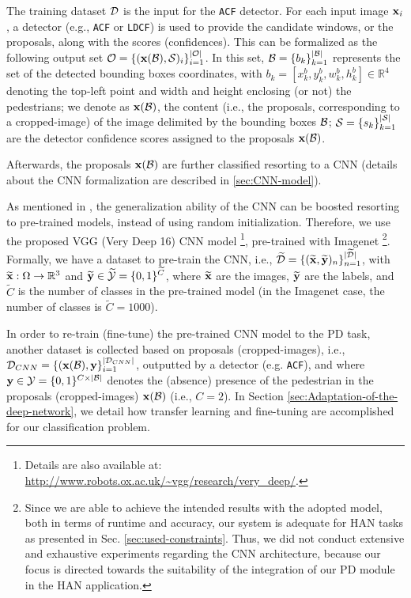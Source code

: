 \documentclass[5p,time]{elsarticle}
\begin{document}
The training dataset ${\cal D}$ is the input for the \texttt{ACF} detector.
For each input image ${\bf x}_i$, a detector (e.g., \texttt{ACF} or \texttt{LDCF}) is used to provide the candidate windows, or the proposals, along with the scores (confidences). This can be formalized as the following output set ${\cal O}=\{ ({\bf x}({\cal B}), {\cal S})_i\}_{i=1}^{|\cal O|}$. In this set, ${\cal B} = \{b_k\}_{k=1}^{|{\cal B}|}$
represents the set of the detected bounding boxes coordinates, with $b_k=[x^b_k,y^b_k,w^b_k,h^b_k]\in\mathbb{R}^{4}$ denoting the top-left point and width and height enclosing (or not) the pedestrians; we denote as ${\bf x}({\cal B})$, the content (i.e., the proposals, corresponding to a cropped-image) of the image delimited by the bounding boxes ${\cal B}$; ${\cal S}=\{s_k\}_{k=1}^{|{\cal S}|}$ are the detector confidence scores assigned to the proposals ${\bf x}({\cal B})$.

Afterwards, the proposals ${\bf x}({\cal B})$ are further classified resorting to a CNN (details about the CNN formalization are described in \ref{sec:CNN-model}).

As mentioned in \cite{YosinskiNIPS2014}, the generalization ability of the CNN can be boosted resorting to pre-trained models, instead of using random initialization.
Therefore, we use the proposed VGG (Very Deep 16) CNN model
\cite{SimonyanICLR2015}\footnote{Details are also available at: \url{http://www.robots.ox.ac.uk/~vgg/research/very_deep/}.}, pre-trained with Imagenet \cite{RussakovskyIJCV2015}
\footnote{Since we are able to achieve the intended results with the adopted model, both in terms of runtime and accuracy, our system is adequate for HAN tasks as presented in Sec. \ref{sec:used-constraints}. Thus, we did not conduct extensive and exhaustive experiments regarding the CNN architecture, because our focus is directed towards the suitability of the integration of our PD module in the HAN application.}. Formally, we have a dataset to pre-train the CNN, i.e., $\widetilde{\cal D}=\{ (\widetilde{\bf x},\widetilde{\bf y})_n \}_{n=1}^{|{\widetilde{\cal D}}|}$, with $\widetilde{\bf x}:\Omega\rightarrow\mathbb{R}^3$ and $\widetilde{\bf y}\in\widetilde{\cal Y}=\{0,1\}^{\widetilde C}$, where $\widetilde{\bf x}$ are the images, $\widetilde{\bf y}$ are the labels, and $\widetilde C$ is the number of classes in the pre-trained model (in the Imagenet case, the number of classes is $\widetilde{C}=1000$).

In order to re-train (fine-tune) the pre-trained CNN model to the PD task, another dataset is collected based on proposals (cropped-images), i.e., ${\cal D}_{CNN} =\{ ({\bf x}({\cal B}),{\bf y}\}_{i=1}^{|{\cal D}_{CNN}|}$, outputted by a detector (e.g. \texttt{ACF}), and where ${\bf y}\in{\cal Y}=\{0,1\}^{C \times |{\cal B}|}$ denotes the (absence) presence of the pedestrian in the proposals (cropped-images) ${\bf x}({\cal B})$ (i.e., $C=2$). In Section \ref{sec:Adaptation-of-the-deep-network}, we detail how transfer learning and fine-tuning are accomplished for our classification problem.
\end{document}
